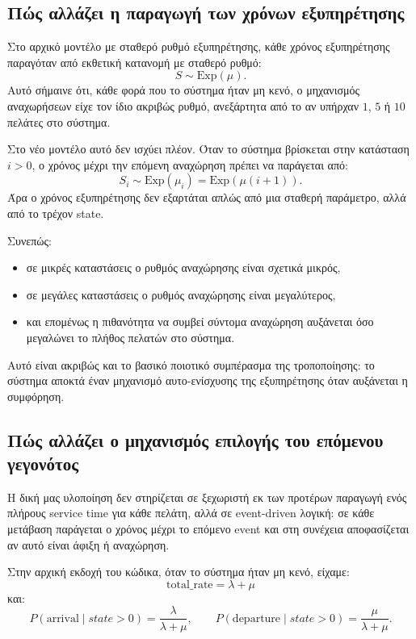 \documentclass{article}
\begin{document}
\subsection{Πώς αλλάζει η παραγωγή των χρόνων εξυπηρέτησης}

Στο αρχικό μοντέλο με σταθερό ρυθμό εξυπηρέτησης, κάθε χρόνος εξυπηρέτησης παραγόταν από εκθετική κατανομή με σταθερό ρυθμό:
\[
S \sim \mathrm{Exp}(\mu).
\]
Αυτό σήμαινε ότι, κάθε φορά που το σύστημα ήταν μη κενό, ο μηχανισμός αναχωρήσεων είχε τον ίδιο ακριβώς ρυθμό, ανεξάρτητα από το αν υπήρχαν $1$, $5$ ή $10$ πελάτες στο σύστημα.

Στο νέο μοντέλο αυτό δεν ισχύει πλέον. Όταν το σύστημα βρίσκεται στην κατάσταση $i>0$, ο χρόνος μέχρι την επόμενη αναχώρηση πρέπει να παράγεται από:
\[
S_i \sim \mathrm{Exp}(\mu_i)=\mathrm{Exp}(\mu(i+1)).
\]
Άρα ο χρόνος εξυπηρέτησης δεν εξαρτάται απλώς από μια σταθερή παράμετρο, αλλά από το τρέχον state.

Συνεπώς:

\begin{itemize}
    \item σε μικρές καταστάσεις ο ρυθμός αναχώρησης είναι σχετικά μικρός,
    \item σε μεγάλες καταστάσεις ο ρυθμός αναχώρησης είναι μεγαλύτερος,
    \item και επομένως η πιθανότητα να συμβεί σύντομα αναχώρηση αυξάνεται όσο μεγαλώνει το πλήθος πελατών στο σύστημα.
\end{itemize}

Αυτό είναι ακριβώς και το βασικό ποιοτικό συμπέρασμα της τροποποίησης: το σύστημα αποκτά έναν μηχανισμό αυτο-ενίσχυσης της εξυπηρέτησης όταν αυξάνεται η συμφόρηση.

\subsection{Πώς αλλάζει ο μηχανισμός επιλογής του επόμενου γεγονότος}

Η δική μας υλοποίηση δεν στηρίζεται σε ξεχωριστή εκ των προτέρων παραγωγή ενός πλήρους service time για κάθε πελάτη, αλλά σε \foreignlanguage{english}{event-driven} λογική: σε κάθε μετάβαση παράγεται ο χρόνος μέχρι το επόμενο event και στη συνέχεια αποφασίζεται αν αυτό είναι άφιξη ή αναχώρηση.

Στην αρχική εκδοχή του κώδικα, όταν το σύστημα ήταν μη κενό, είχαμε:
\[
\text{total\_rate} = \lambda + \mu
\]
και:
\[
P(\text{arrival} \mid state>0)=\frac{\lambda}{\lambda+\mu},
\qquad
P(\text{departure} \mid state>0)=\frac{\mu}{\lambda+\mu}.
\]
\end{document}
